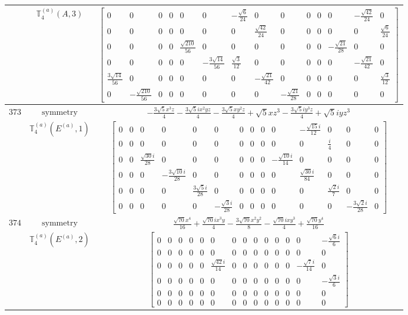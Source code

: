 \documentclass[fleqn,8pt,landscape]{jsarticle}
\begin{document}
\begin{longtable}{ccc}
$  $ & $ \mathbb{T}_{4}^{(a)}(A,3) $ & $ \begin{bmatrix} 0 & 0 & 0 & 0 & 0 & 0 & - \frac{\sqrt{6}}{24} & 0 & 0 & 0 & 0 & 0 & - \frac{\sqrt{42}}{24} & 0 \\ 0 & 0 & 0 & 0 & 0 & 0 & 0 & \frac{\sqrt{42}}{24} & 0 & 0 & 0 & 0 & 0 & \frac{\sqrt{6}}{24} \\ 0 & 0 & 0 & 0 & \frac{\sqrt{210}}{56} & 0 & 0 & 0 & 0 & 0 & 0 & - \frac{\sqrt{21}}{28} & 0 & 0 \\ 0 & 0 & 0 & 0 & 0 & - \frac{3 \sqrt{14}}{56} & \frac{\sqrt{3}}{12} & 0 & 0 & 0 & 0 & 0 & - \frac{\sqrt{21}}{42} & 0 \\ \frac{3 \sqrt{14}}{56} & 0 & 0 & 0 & 0 & 0 & 0 & - \frac{\sqrt{21}}{42} & 0 & 0 & 0 & 0 & 0 & \frac{\sqrt{3}}{12} \\ 0 & - \frac{\sqrt{210}}{56} & 0 & 0 & 0 & 0 & 0 & 0 & - \frac{\sqrt{21}}{28} & 0 & 0 & 0 & 0 & 0 \end{bmatrix} $ \\ \hline
$ 373 $ & $ \text{symmetry} $ & $ - \frac{3 \sqrt{5} x^{3} z}{4} - \frac{3 \sqrt{5} i x^{2} y z}{4} - \frac{3 \sqrt{5} x y^{2} z}{4} + \sqrt{5} x z^{3} - \frac{3 \sqrt{5} i y^{3} z}{4} + \sqrt{5} i y z^{3} $ \\
$  $ & $ \mathbb{T}_{4}^{(a)}(E^{(a)},1) $ & $ \begin{bmatrix} 0 & 0 & 0 & 0 & 0 & 0 & 0 & 0 & 0 & 0 & - \frac{\sqrt{15} i}{12} & 0 & 0 & 0 \\ 0 & 0 & 0 & 0 & 0 & 0 & 0 & 0 & 0 & 0 & 0 & \frac{i}{4} & 0 & 0 \\ 0 & 0 & \frac{\sqrt{30} i}{28} & 0 & 0 & 0 & 0 & 0 & 0 & - \frac{\sqrt{10} i}{14} & 0 & 0 & 0 & 0 \\ 0 & 0 & 0 & - \frac{3 \sqrt{10} i}{28} & 0 & 0 & 0 & 0 & 0 & 0 & \frac{\sqrt{30} i}{84} & 0 & 0 & 0 \\ 0 & 0 & 0 & 0 & \frac{3 \sqrt{5} i}{28} & 0 & 0 & 0 & 0 & 0 & 0 & \frac{\sqrt{2} i}{7} & 0 & 0 \\ 0 & 0 & 0 & 0 & 0 & - \frac{\sqrt{3} i}{28} & 0 & 0 & 0 & 0 & 0 & 0 & - \frac{3 \sqrt{2} i}{28} & 0 \end{bmatrix} $ \\ \hline
$ 374 $ & $ \text{symmetry} $ & $ \frac{\sqrt{70} x^{4}}{16} + \frac{\sqrt{70} i x^{3} y}{4} - \frac{3 \sqrt{70} x^{2} y^{2}}{8} - \frac{\sqrt{70} i x y^{3}}{4} + \frac{\sqrt{70} y^{4}}{16} $ \\
$  $ & $ \mathbb{T}_{4}^{(a)}(E^{(a)},2) $ & $ \begin{bmatrix} 0 & 0 & 0 & 0 & 0 & 0 & 0 & 0 & 0 & 0 & 0 & 0 & 0 & - \frac{\sqrt{6} i}{6} \\ 0 & 0 & 0 & 0 & 0 & 0 & 0 & 0 & 0 & 0 & 0 & 0 & 0 & 0 \\ 0 & 0 & 0 & 0 & 0 & \frac{\sqrt{42} i}{14} & 0 & 0 & 0 & 0 & 0 & 0 & - \frac{\sqrt{7} i}{14} & 0 \\ 0 & 0 & 0 & 0 & 0 & 0 & 0 & 0 & 0 & 0 & 0 & 0 & 0 & - \frac{\sqrt{3} i}{6} \\ 0 & 0 & 0 & 0 & 0 & 0 & 0 & 0 & 0 & 0 & 0 & 0 & 0 & 0 \\ 0 & 0 & 0 & 0 & 0 & 0 & 0 & 0 & 0 & 0 & 0 & 0 & 0 & 0 \end{bmatrix} $ \\ \hline

\end{longtable}
\end{document}
